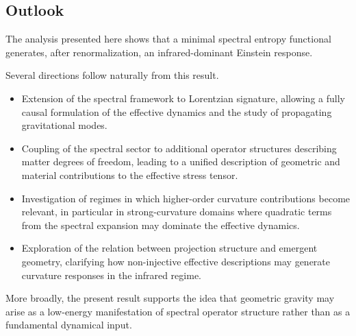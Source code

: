 \subsection{Outlook}
  \label{subsec:outlook}

  The analysis presented here shows that a minimal spectral entropy
  functional generates, after renormalization, an infrared-dominant
  Einstein response.

  Several directions follow naturally from this result.

  \begin{itemize}

    \item Extension of the spectral framework to Lorentzian signature,
    allowing a fully causal formulation of the effective dynamics and
    the study of propagating gravitational modes.

    \item Coupling of the spectral sector to additional operator
    structures describing matter degrees of freedom, leading to a
    unified description of geometric and material contributions to the
    effective stress tensor.

    \item Investigation of regimes in which higher-order curvature
    contributions become relevant, in particular in strong-curvature
    domains where quadratic terms from the spectral expansion may
    dominate the effective dynamics.

    \item Exploration of the relation between projection structure and
    emergent geometry, clarifying how non-injective effective
    descriptions may generate curvature responses in the infrared
    regime.

  \end{itemize}

  More broadly, the present result supports the idea that geometric
  gravity may arise as a low-energy manifestation of spectral
  operator structure rather than as a fundamental dynamical input.

